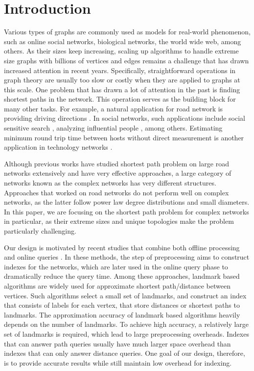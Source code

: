 \section{Introduction}
\label{introduction}

Various types of graphs are commonly used as models for real-world phenomenon, such as online social networks, biological networks, the world wide web, among others. As their sizes keep increasing, scaling up algorithms to handle extreme size graphs with billions of vertices and edges remains a challenge that has drawn increased attention in recent years. Specifically, straightforward operations in graph theory are usually too slow or costly when they are applied to graphs at this scale. One problem that has drawn a lot of attention in the past is finding shortest paths in the network. This operation serves as the building block for many other tasks. For example, a natural application for road network is providing driving directions \cite{Abraham:2011:HLA:2008623.2008645}. In social networks, such applications include social sensitive search \cite{Vieira:2007:ESR:1321440.1321520}, analyzing influential people \cite{Kempe:2003:MSI:956750.956769}, among others. Estimating minimum round trip time between hosts without direct measurement is another application in technology networks \cite{Tang:2003:VLI:948205.948223}.

Although previous works have studied shortest path problem on large road networks extensively and have very effective approaches, a large category of networks known as the complex networks has very different structures. Approaches that worked on road networks do not perform well on complex networks, as the latter follow power law degree distributions and small diameters. In this paper, we are focusing on the shortest path problem for complex networks in particular, as their extreme sizes and unique topologies make the problem particularly challenging.

Our design is motivated by recent studies that combine both offline processing and online queries \cite{Potamias:2009:FSP:1645953.1646063, tretyakov2011fast, Akiba:2012:SQC:2247596.2247614, 6399472, Jin:2012:HLA:2213836.2213887}. In these methods, the step of preprocessing aims to construct indexes for the networks, which are later used in the online query phase to dramatically reduce the query time. Among these approaches, landmark based algorithms \cite{Thorup:2005:ADO:1044731.1044732, Goldberg:2005:CSP:1070432.1070455, Potamias:2009:FSP:1645953.1646063, Gubichev:2010:FAE:1871437.1871503, tretyakov2011fast, 6399472}are widely used for approximate shortest path/distance between vertices. Such algorithms select a small set of landmarks, and construct an index that consists of labels for each vertex, that store distances or shortest paths to landmarks. The approximation accuracy of landmark based algorithms heavily depends on the number of landmarks. To achieve high accuracy, a relatively large set of landmarks is required, which lead to large preprocessing overheads. Indexes that can answer path queries usually have much larger space overhead than indexes that can only answer distance queries. One goal of our design, therefore, is to provide accurate results while still maintain low overhead for indexing.

